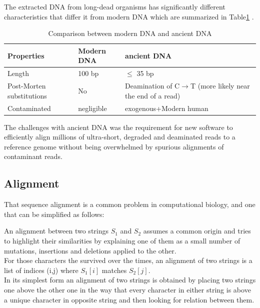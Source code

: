 \documentclass[11pt,a4paper]{report}
\begin{document}
The extracted DNA from long-dead organisms has significantly different characteristics
 that differ it from modern DNA which are summarized in Table\ref{aDNAchar} .\\



\begin{table}[H]
  \begin{tabular}{ |  p{4cm} | p{2cm} | p{5cm} |}
    \hline
  \textbf{  Properties} & \textbf{Modern DNA } &\textbf{ ancient DNA} \\ \hline
       Length &  100 bp  & $\leq$  35 bp \\ \hline
       Post-Morten \hspace{35pt} substitutions & No  & Deamination of C$\to$T
(more likely near the end of a read) \\ \hline
  Contaminated & negligible & exogenous+Modern human\\ \hline
    \end{tabular}
\caption{Comparison between modern DNA and ancient DNA}
\label{aDNAchar}
\end{table}


The challenges with ancient DNA was the requirement for new software to efficiently 
align millions of ultra-short, degraded and deaminated reads to a reference genome 
without being overwhelmed by spurious alignments of contaminant reads.


\subsection{Alignment} \label{Alignment}

That sequence alignment is a common problem in computational biology, 
and one that can be simplified as follows:

An alignment between two strings $S_{1}$ and $S_{2}$ assumes a common origin and 
tries to highlight their similarities by explaining one of them as a small number 
of mutations, insertions and deletions applied to the other.\\

For those characters the survived over the times, an alignment of two strings is 
a list of indices (i,j) where $S_{1}[i]$ matches $S_{2}[j]$.\\ 
In its simplest form an alignment of two strings is obtained by placing two strings
one above the other one in the way that every character in either string is above 
a unique character in opposite string and then looking for relation between them.\\\\
\end{document}
